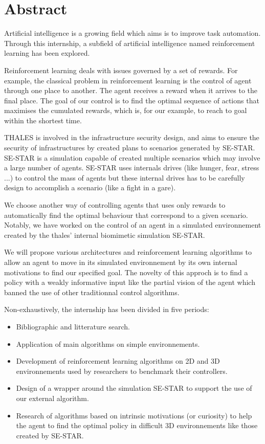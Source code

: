 \section*{Abstract}
\bigskip

Artificial intelligence is a growing field which aims is to improve task automation. Through this internship, a subfield of artificial intelligence named reinforcement learning has been explored.

Reinforcement learning deals with issues governed by a set of rewards. For example, the classical problem in reinforcement learning is the control of agent through one place to another. The agent receives a reward when it arrives to the final place.  The goal of our control is to find the optimal sequence of actions that maximises the cumulated rewards, which is, for our example, to reach to goal within the shortest time.

THALES is involved in the infrastructure security design, and aims to ensure the security of infrastructures by created plans to scenarios generated by SE-STAR. 
SE-STAR is a simulation capable of created multiple scenarios which may involve a large number of agents. SE-STAR uses internals drives (like hunger, fear, stress ...) to control the mass of agents but these internal drives has to be carefully design to accomplish a scenario (like a fight in a gare).

We choose another way of controlling agents that uses only rewards to automatically find the optimal behaviour that correspond to a given scenario.
Notably, we have worked on the control of an agent in a simulated environnement created by the thales' internal biomimetic simulation SE-STAR.

We will propose various architectures and reinforcement learning algorithms to allow an agent to move in its simulated environnement by its own internal motivations to find our specified goal. The novelty of this approch is to find a policy with a weakly informative input like the partial vision of the agent which banned the use of other traditionnal control algorithms. 

Non-exhaustively, the internship has been divided in five periods:

\begin{itemize}
    \item Bibliographic and litterature search.
    \item Application of main algorithms on simple environnements.
    \item Development of reinforcement learning algorithms on 2D and 3D environnements used by researchers to benchmark their controllers. 
    \item Design of a wrapper around the simulation SE-STAR to support the use of our external algorithm.
    \item Research of algorithms based on intrinsic motivations (or curiosity) to help the agent to find the optimal policy in difficult 3D environnements like those created by SE-STAR. 
\end{itemize} 

